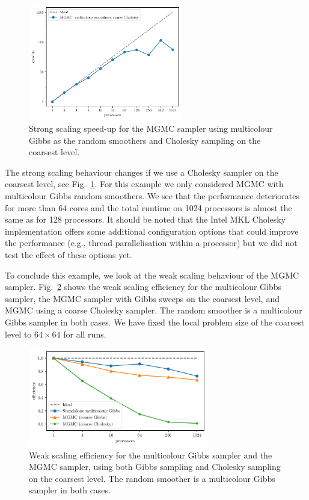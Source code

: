 \documentclass[
fontsize=11pt,
paper=a4,
numbers=noenddot
]{scrartcl}
\begin{document}
\begin{figure}[htbp]
    \centering
    \includegraphics[width=0.6\textwidth]{plots/strong_scaling_mgmc+mg+cholesky_4097x4097.pdf}
    \caption{Strong scaling speed-up for the MGMC sampler using multicolour Gibbs as the random smoothers and Cholesky sampling on the coarsest level.}
    \label{fig:2d_structured_mgmc_chol_ss}
\end{figure}

The strong scaling behaviour changes if we use a Cholesky sampler on the coarsest level, see Fig.~\ref{fig:2d_structured_mgmc_chol_ss}. For this example we only considered MGMC with multicolour Gibbs random smoothers. We see that the performance deteriorates for more than 64 cores and the total runtime on 1024 processors is almost the same as for 128 processors. It should be noted that the Intel MKL Cholesky implementation offers some additional configuration options that could improve the performance (e.g., thread parallelisation within a processor) but we did not test the effect of these options yet.

To conclude this example, we look at the weak scaling behaviour of the MGMC sampler. Fig.~\ref{fig:2d_structured_ws} shows the weak scaling efficiency for the multicolour Gibbs sampler, the MGMC sampler with Gibbs sweeps on the coarsest level, and MGMC using a coarse Cholesky sampler. The random smoother is a multicolour Gibbs sampler in both cases. We have fixed the local problem size of the coarsest level to $64 \times 64$ for all runs.

\begin{figure}[htbp]
    \centering
    \includegraphics[width=0.7\textwidth]{plots/weak_scaling_64x64.pdf}
    \caption{Weak scaling efficiency for the multicolour Gibbs sampler and the MGMC sampler, using both Gibbs sampling and Cholesky sampling on the coarsest level. The random smoother is a multicolour Gibbs sampler in both cases.}
    \label{fig:2d_structured_ws}
\end{figure}
\end{document}
